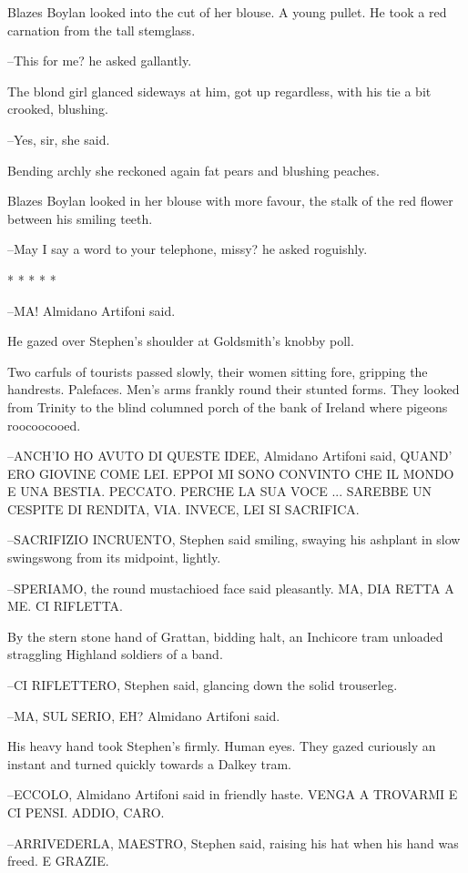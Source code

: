 Blazes Boylan looked into the cut of her blouse. A young pullet. He
took a red carnation from the tall stemglass.

--This for me? he asked gallantly.

The blond girl glanced sideways at him, got up regardless, with his tie
a bit crooked, blushing.

--Yes, sir, she said.

Bending archly she reckoned again fat pears and blushing peaches.

Blazes Boylan looked in her blouse with more favour, the stalk of the
red flower between his smiling teeth.

--May I say a word to your telephone, missy? he asked roguishly.


    * * * * *


--MA! Almidano Artifoni said.

He gazed over Stephen's shoulder at Goldsmith's knobby poll.

Two carfuls of tourists passed slowly, their women sitting fore,
gripping the handrests. Palefaces. Men's arms frankly round their stunted
forms. They looked from Trinity to the blind columned porch of the bank
of Ireland where pigeons roocoocooed.

--ANCH'IO HO AVUTO DI QUESTE IDEE, Almidano Artifoni said, QUAND' ERO
GIOVINE COME LEI. EPPOI MI SONO CONVINTO CHE IL MONDO E UNA BESTIA.
PECCATO. PERCHE LA SUA VOCE ... SAREBBE UN CESPITE DI RENDITA, VIA.
INVECE, LEI SI SACRIFICA.

--SACRIFIZIO INCRUENTO, Stephen said smiling, swaying his ashplant in slow
swingswong from its midpoint, lightly.

--SPERIAMO, the round mustachioed face said pleasantly. MA, DIA RETTA A
ME. CI RIFLETTA.

By the stern stone hand of Grattan, bidding halt, an Inchicore tram
unloaded straggling Highland soldiers of a band.

--CI RIFLETTERO, Stephen said, glancing down the solid trouserleg.

--MA, SUL SERIO, EH? Almidano Artifoni said.

His heavy hand took Stephen's firmly. Human eyes. They gazed
curiously an instant and turned quickly towards a Dalkey tram.

--ECCOLO, Almidano Artifoni said in friendly haste. VENGA A TROVARMI E CI
PENSI. ADDIO, CARO.

--ARRIVEDERLA, MAESTRO, Stephen said, raising his hat when his hand was
freed. E GRAZIE.

